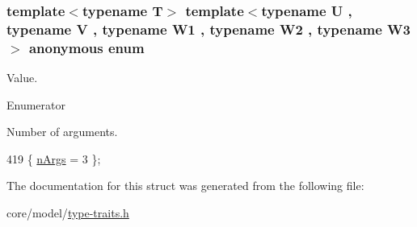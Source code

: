 \subsubsection[{\texorpdfstring{anonymous enum}{anonymous enum}}]{\setlength{\rightskip}{0pt plus 5cm}template$<$typename T$>$ template$<$typename U , typename V , typename W1 , typename W2 , typename W3 $>$ anonymous enum}\hypertarget{structTypeTraits_1_1PtrToMemberTraits_3_01U_07V_1_1_5_08_07W1_00_01W2_00_01W3_08_01const_01_01_4_aee45640458aee1c1fc72605f345cf1d5}{}\label{structTypeTraits_1_1PtrToMemberTraits_3_01U_07V_1_1_5_08_07W1_00_01W2_00_01W3_08_01const_01_01_4_aee45640458aee1c1fc72605f345cf1d5}
Value. \begin{Desc}
\item[Enumerator]\par
\begin{description}
\item[{\em 
n\+Args\hypertarget{structTypeTraits_1_1PtrToMemberTraits_3_01U_07V_1_1_5_08_07W1_00_01W2_00_01W3_08_01const_01_01_4_aee45640458aee1c1fc72605f345cf1d5af9629127792133406ec2e56fb81b209d}{}\label{structTypeTraits_1_1PtrToMemberTraits_3_01U_07V_1_1_5_08_07W1_00_01W2_00_01W3_08_01const_01_01_4_aee45640458aee1c1fc72605f345cf1d5af9629127792133406ec2e56fb81b209d}
}]Number of arguments. \end{description}
\end{Desc}

\begin{DoxyCode}
419 \{ \hyperlink{structTypeTraits_1_1PtrToMemberTraits_3_01U_07V_1_1_5_08_07W1_00_01W2_00_01W3_08_01const_01_01_4_aee45640458aee1c1fc72605f345cf1d5af9629127792133406ec2e56fb81b209d}{nArgs} = 3                \};
\end{DoxyCode}


The documentation for this struct was generated from the following file\+:\begin{DoxyCompactItemize}
\item 
core/model/\hyperlink{type-traits_8h}{type-\/traits.\+h}\end{DoxyCompactItemize}
